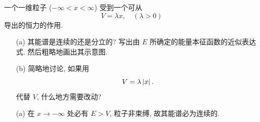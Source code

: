 \documentclass{assignment}
\begin{document}
\begin{prob}[课本习题 2.26]
    一个一维粒子 ($-\infty<x<\infty$) 受到一个可从
    \[
        V=\lambda x,\quad(\lambda>0)
    \]
    导出的恒力的作用.
    \begin{itemize}
        \item[(a)] 其能谱是连续的还是分立的? 写出由 $E$ 所确定的能量本征函数的近似表达式. 然后粗略地画出其示意图.
        \item[(b)] 简略地讨论, 如果用
        \[
            V=\lambda\left\lvert x\right\rvert.
        \]
        代替 $V$, 什么地方需要改动?
    \end{itemize}
\end{prob}
\begin{sol}
    \begin{itemize}
        \item[(a)] 在 $x\rightarrow-\infty$ 处必有 $E>V$, 粒子非束缚, 故其能谱必为连续的.


\end{itemize}
\end{sol}
\end{document}
